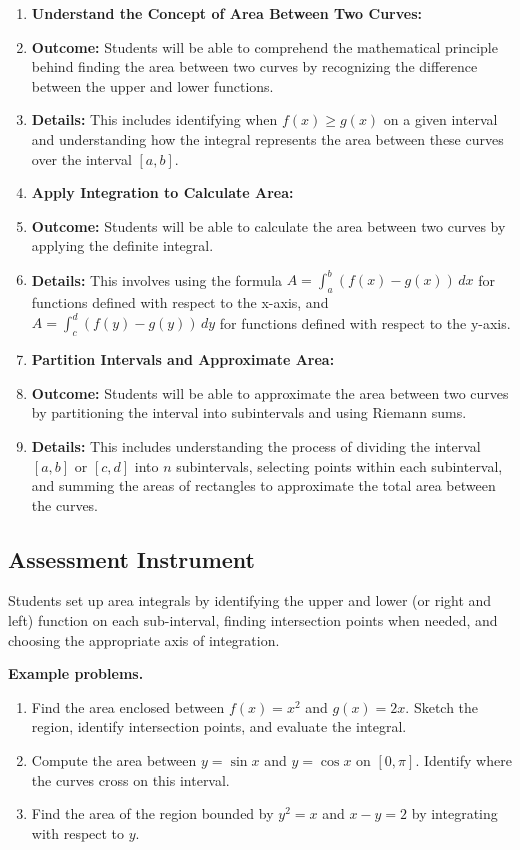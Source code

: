 \begin{enumerate}
    \item \textbf{Understand the Concept of Area Between Two Curves:}
    \item \textbf{Outcome:} Students will be able to comprehend the mathematical principle behind finding the area between two curves by recognizing the difference between the upper and lower functions.
    \item \textbf{Details:} This includes identifying when $f(x) \geq g(x)$ on a given interval and understanding how the integral represents the area between these curves over the interval $[a, b]$.
    \item \textbf{Apply Integration to Calculate Area:}
    \item \textbf{Outcome:} Students will be able to calculate the area between two curves by applying the definite integral.
    \item \textbf{Details:} This involves using the formula $A = \int_a^b (f(x) - g(x)) \, dx$ for functions defined with respect to the x-axis, and $A = \int_c^d (f(y) - g(y)) \, dy$ for functions defined with respect to the y-axis.
    \item \textbf{Partition Intervals and Approximate Area:}
    \item \textbf{Outcome:} Students will be able to approximate the area between two curves by partitioning the interval into subintervals and using Riemann sums.
    \item \textbf{Details:} This includes understanding the process of dividing the interval $[a, b]$ or $[c, d]$ into $n$ subintervals, selecting points within each subinterval, and summing the areas of rectangles to approximate the total area between the curves.
\end{enumerate}

\subsection{Assessment Instrument}
\label{ssec:area-1946}

Students set up area integrals by identifying the upper and lower (or right and left) function on each sub-interval, finding intersection points when needed, and choosing the appropriate axis of integration.

\textbf{Example problems.}

\begin{enumerate}
    \item Find the area enclosed between $f(x)=x^2$ and $g(x)=2x$. Sketch the region, identify intersection points, and evaluate the integral.
    \item Compute the area between $y = \sin x$ and $y = \cos x$ on $[0, \pi]$. Identify where the curves cross on this interval.
    \item Find the area of the region bounded by $y^2 = x$ and $x - y = 2$ by integrating with respect to $y$.
\end{enumerate}

